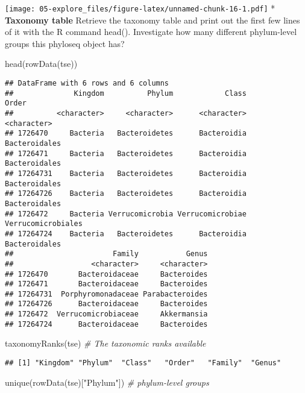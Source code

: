 \documentclass[
  oneside]{book}
\newenvironment{Shaded}{\begin{snugshade}}{\end{snugshade}}
\newcommand{\CommentTok}[1]{\textcolor[rgb]{0.56,0.35,0.01}{\textit{#1}}}
\newcommand{\FunctionTok}[1]{\textcolor[rgb]{0.00,0.00,0.00}{#1}}
\newcommand{\NormalTok}[1]{#1}
\newcommand{\StringTok}[1]{\textcolor[rgb]{0.31,0.60,0.02}{#1}}
\begin{document}
\texttt{[image: 05-explore\_files/figure-latex/unnamed-chunk-16-1.pdf]}
* \textbf{Taxonomy table} Retrieve the taxonomy table and print out the
first few lines of it with the R command head(). Investigate how
many different phylum-level groups this phyloseq object has?

\begin{Shaded}
\begin{Highlighting}[]
\FunctionTok{head}\NormalTok{(}\FunctionTok{rowData}\NormalTok{(tse))}
\end{Highlighting}
\end{Shaded}

\begin{verbatim}
## DataFrame with 6 rows and 6 columns
##              Kingdom          Phylum            Class              Order
##          <character>     <character>      <character>        <character>
## 1726470     Bacteria   Bacteroidetes      Bacteroidia      Bacteroidales
## 1726471     Bacteria   Bacteroidetes      Bacteroidia      Bacteroidales
## 17264731    Bacteria   Bacteroidetes      Bacteroidia      Bacteroidales
## 17264726    Bacteria   Bacteroidetes      Bacteroidia      Bacteroidales
## 1726472     Bacteria Verrucomicrobia Verrucomicrobiae Verrucomicrobiales
## 17264724    Bacteria   Bacteroidetes      Bacteroidia      Bacteroidales
##                       Family           Genus
##                  <character>     <character>
## 1726470       Bacteroidaceae     Bacteroides
## 1726471       Bacteroidaceae     Bacteroides
## 17264731  Porphyromonadaceae Parabacteroides
## 17264726      Bacteroidaceae     Bacteroides
## 1726472  Verrucomicrobiaceae     Akkermansia
## 17264724      Bacteroidaceae     Bacteroides
\end{verbatim}

\begin{Shaded}
\begin{Highlighting}[]
\FunctionTok{taxonomyRanks}\NormalTok{(tse) }\CommentTok{\# The taxonomic ranks available}
\end{Highlighting}
\end{Shaded}

\begin{verbatim}
## [1] "Kingdom" "Phylum"  "Class"   "Order"   "Family"  "Genus"
\end{verbatim}

\begin{Shaded}
\begin{Highlighting}[]
\FunctionTok{unique}\NormalTok{(}\FunctionTok{rowData}\NormalTok{(tse)[}\StringTok{"Phylum"}\NormalTok{]) }\CommentTok{\# phylum{-}level groups}
\end{Highlighting}
\end{Shaded}
\end{document}
